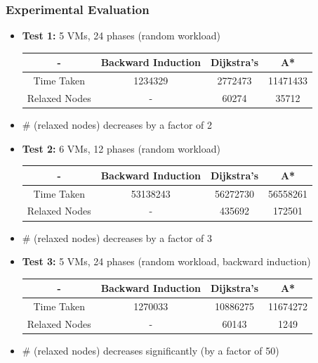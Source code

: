 \documentclass{beamer}
\makeatletter
\newcounter{multipleslide}
\newcommand{\multipleframe}
{
	\setcounter{multipleslide}{\value{framenumber}}
	\stepcounter{multipleslide}
	\patchcmd{\beamer@@tmpl@footline}
	{\insertframenumber}
	{\themultipleslide}
	{}
	{}
}
\makeatother
\begin{document}
\multipleframe
\begin{frame}[allowframebreaks]
\frametitle{Experimental Evaluation}
\begin{itemize}
\item \textbf{Test 1:} 5 VMs, 24 phases (random workload)
\begin{center}
\begin{table}[h]
\begin{tabular}{|c|c|c|c|}
\hline 
- & Backward Induction & Dijkstra's & A* \\ 
\hline 
Time Taken & 1234329 & 2772473 & 11471433 \\ 
\hline 
Relaxed Nodes & - & 60274 & 35712 \\ 
\hline 
\end{tabular} 
\end{table}
\end{center}
\item \# (relaxed nodes) decreases by a factor of 2
\item \textbf{Test 2:} 6 VMs, 12 phases (random workload)
\begin{center}
\begin{table}[h]
\begin{tabular}{|c|c|c|c|}
\hline 
- & Backward Induction & Dijkstra's & A* \\ 
\hline 
Time Taken & 53138243 & 56272730 & 56558261 \\ 
\hline 
Relaxed Nodes & - & 435692 & 172501 \\ 
\hline 
\end{tabular} 
\end{table}
\end{center}
\item \# (relaxed nodes) decreases by a factor of 3
\newpage
\item \textbf{Test 3:} 5 VMs, 24 phases (random workload, backward induction)
\begin{center}
\begin{table}[h]
\begin{tabular}{|c|c|c|c|}
\hline 
- & Backward Induction & Dijkstra's & A* \\ 
\hline 
Time Taken & 1270033 & 10886275 & 11674272 \\ 
\hline 
Relaxed Nodes & - & 60143 & 1249 \\ 
\hline 
\end{tabular} 
\end{table}
\end{center}
\item \# (relaxed nodes) decreases significantly (by a factor of 50)

\end{itemize}
\end{frame}
\end{document}
